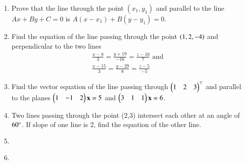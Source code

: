 \begin{enumerate}[label=\thesection.\arabic*,ref=\thesection.\theenumi]
\label{chapters/11/10/3/8}
\solution

\item Prove that the line through the point $(x_1,y_1)$ and parallel to the line $Ax+By+C=0$ is $A(x-x_1)+B(y-y_1)=0$.
\label{chapters/11/10/3/11}
\\
\solution

	\item Find the equation of the line passing through the point $\left(1,2,-4\right)$ and perpendicular to the two lines
\begin{align}
	\frac{x-8}{3}=\frac{y+19}{-16}=\frac{z-10}{7} \text{ and }\\ \frac{x-15}{3}=\frac{y-29}{8}=\frac{z-5}{-5} 
\end{align}
    \solution
		
	\item  Find the vector equation of the line passing through $\begin{pmatrix}1&2&3\end{pmatrix}^{\top}$ and parallel to the planes $\begin{pmatrix}1&-1&2\end{pmatrix}\mathbf{x} = 5$ and $\begin{pmatrix}3&1&1\end{pmatrix}\mathbf{x} = 6$.  
		\\
    \solution
		
	\item
 Two lines passing through the point (2,3) intersect each other at an angle of $60\degree$. If slope of one line is 2, find the equation of the other line.
 \\
 \solution
		
\label{chapters/11/10/3/12}
\item
%
\item
	\label{12.11.2.3}
 

\end{enumerate}
